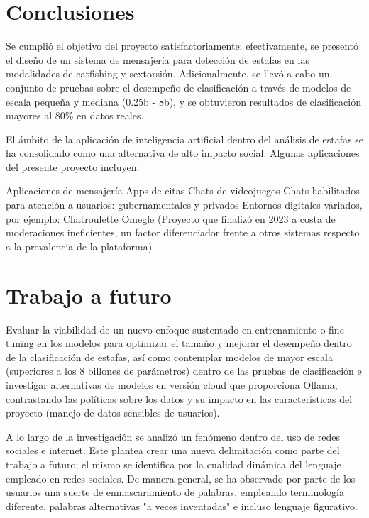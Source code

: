 \section{Conclusiones}

Se cumplió el objetivo del proyecto satisfactoriamente; efectivamente, se presentó el diseño de un sistema de mensajería para detección de estafas en las modalidades de catfishing y sextorsión. Adicionalmente, se llevó a cabo un conjunto de pruebas sobre el desempeño de clasificación a través de modelos de escala pequeña y mediana (0.25b - 8b), y se obtuvieron resultados de clasificación mayores al 80\% en datos reales.

El ámbito de la aplicación de inteligencia artificial dentro del análisis de estafas se ha consolidado como una alternativa de alto impacto social. Algunas aplicaciones del presente proyecto incluyen:

Aplicaciones de mensajería
Apps de citas
Chats de videojuegos
Chats habilitados para atención a usuarios: gubernamentales y privados
Entornos digitales variados, por ejemplo:
Chatroulette
Omegle (Proyecto que finalizó en 2023 a costa de moderaciones ineficientes, un factor diferenciador frente a otros sistemas respecto a la prevalencia de la plataforma)

\section{Trabajo a futuro}

Evaluar la viabilidad de un nuevo enfoque sustentado en entrenamiento o fine tuning en los modelos para optimizar el tamaño y mejorar el desempeño dentro de la clasificación de estafas, así como contemplar modelos de mayor escala (superiores a los 8 billones de parámetros) dentro de las pruebas de clasificación e investigar alternativas de modelos en versión cloud que proporciona Ollama, contrastando las políticas sobre los datos y su impacto en las características del proyecto (manejo de datos sensibles de usuarios).

A lo largo de la investigación se analizó un fenómeno dentro del uso de redes sociales e internet. Este plantea crear una nueva delimitación como parte del trabajo a futuro; el mismo se identifica por la cualidad dinámica del lenguaje empleado en redes sociales. De manera general, se ha observado por parte de los usuarios una suerte de enmascaramiento de palabras, empleando terminología diferente, palabras alternativas "a veces inventadas" e incluso lenguaje figurativo.

